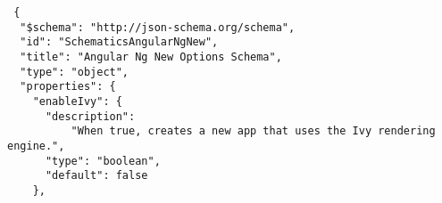 \begin{verbatim}
 {
  "$schema": "http://json-schema.org/schema",
  "id": "SchematicsAngularNgNew",
  "title": "Angular Ng New Options Schema",
  "type": "object",
  "properties": {
    "enableIvy": {
      "description":
          "When true, creates a new app that uses the Ivy rendering engine.",
      "type": "boolean",
      "default": false
    },
\end{verbatim}
